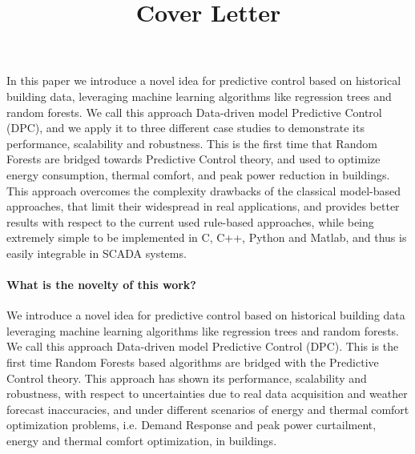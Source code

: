 \documentclass[12pt]{article}
\begin{document}
\title{Cover Letter}
\date{}
\author{}
\maketitle 
\thispagestyle{empty}

In this paper we introduce a novel idea for predictive control based on historical building data, leveraging machine learning algorithms like regression trees and random forests. We call this approach Data-driven model Predictive Control (DPC), and we apply it to three different case studies to demonstrate its performance, scalability and robustness. This is the first time that Random Forests are bridged towards Predictive Control theory, and used to optimize energy consumption, thermal comfort, and peak power reduction in buildings. This approach overcomes the complexity drawbacks of the classical model-based approaches, that limit their widespread in real applications, and provides better results with respect to the current used rule-based approaches, while being extremely simple to be implemented in C, C++, Python and Matlab, and thus is easily integrable in SCADA systems.

\paragraph{What is the novelty of this work?}
We introduce a novel idea for predictive control based on historical building data leveraging machine learning algorithms like regression trees and random forests. We call this approach Data-driven model Predictive Control (DPC). This is the first time Random Forests based algorithms are bridged with the Predictive Control theory. This approach has shown its performance, scalability and robustness, with respect to uncertainties due to real data acquisition and weather forecast inaccuracies, and under different scenarios of energy and thermal comfort optimization problems, i.e. Demand Response and peak power curtailment, energy and thermal comfort optimization, in buildings.
\end{document}
